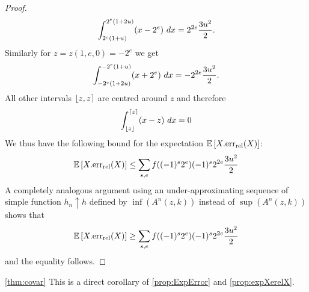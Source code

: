 \begin{proof}
\[
\int_{2^e(1+u)}^{2^e(1+2u)} (x-2^e)~dx = 2^{2e}\frac{3u^2}{2}.
\]
Similarly for $z=z(1,e,0)=-2^e$ we get
\[
\int^{-2^e(1+u)}_{-2^e(1+2u)} (x+2^e)~dx = -2^{2e}\frac{3u^2}{2}.
\]
All other intervals $\fintvl$ are centred around $z$ and therefore
\[
\int_{\lfloor z \rfloor}^{\lceil z \rceil} (x-z)~dx = 0
\]
We thus have the following bound for the expectation $\mathbb{E}\left[X.\mathrm{err}_{\mathrm{rel}}(X)\right]$:
\[
\mathbb{E}\left[X.\mathrm{err}_{\mathrm{rel}}(X)\right]\leq \sum_{s,e} f((-1)^s2^e)(-1)^s2^{2e}\frac{3u^2}{2}
\]
A completely analogous argument using an under-approximating sequence of simple function $h_n\uparrow h$ defined by $\inf(A^n(z,k))$ instead of $\sup(A^n(z,k))$ shows that
\[
\mathbb{E}\left[X.\mathrm{err}_{\mathrm{rel}}(X)\right]\geq \sum_{s,e} f((-1)^s2^e)(-1)^s2^{2e}\frac{3u^2}{2}
\]
and the equality follows.
\flushright{$\square$}
\end{proof}



\begin{myproof}{\cref{thm:covar}}
This is a direct corollary of \cref{prop:ExpError} and \cref{prop:expXerelX}.
\end{myproof}

